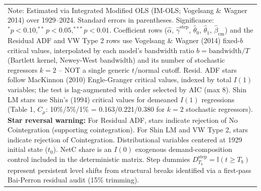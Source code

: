 \begin{table}[H]
\begin{tabular}{p{3.8cm}p{1.35cm}p{1.35cm}p{1.35cm}p{1.35cm}}
\multicolumn{5}{p{13.2cm}}{\footnotesize Note: Estimated via Integrated Modified OLS (IM-OLS; Vogelsang \& Wagner 2014) over 1929--2024. Standard errors in parentheses. Significance: $^*p<0.10, ^{**}p<0.05, ^{***}p<0.01$. Coefficient rows ($\hat{\alpha}$, $\hat{\gamma}^{\text{step}}$, $\hat{\theta}_0$, $\hat{\theta}_1$, $\hat{\beta}_{\text{cm}}$) and the Residual ADF and VW Type 2 rows use Vogelsang \& Wagner (2014) fixed-$b$ critical values, interpolated by each model's bandwidth ratio $b=\text{bandwidth}/T$ (Bartlett kernel, Newey-West bandwidth) and its number of stochastic regressors $k=2$ -- NOT a single generic $t$/normal cutoff. Resid. ADF stars follow MacKinnon (2010) Engle-Granger critical values, indexed by total $I(1)$ variables; the test is lag-augmented with order selected by AIC (max 8). Shin LM stars use Shin's (1994) critical values for demeaned $I(1)$ regressions (Table 1, $C_\mu$: 10\%/5\%/1\% = 0.163/0.221/0.380 for $k=2$ stochastic regressors). \textbf{Star reversal warning:} For Residual ADF, stars indicate rejection of No Cointegration (supporting cointegration). For Shin LM and VW Type 2, stars indicate rejection of Cointegration. Distributional variables centered at 1929 initial state ($t_0$). NetC share is an $I(0)$ exogenous demand-composition control included in the deterministic matrix. Step dummies $D^{\text{step}}_{T_b} = \mathbb{I}(t \ge T_b)$ represent persistent level shifts from structural breaks identified via a first-pass Bai-Perron residual audit (15\% trimming).}
\end{tabular}
\end{table}

